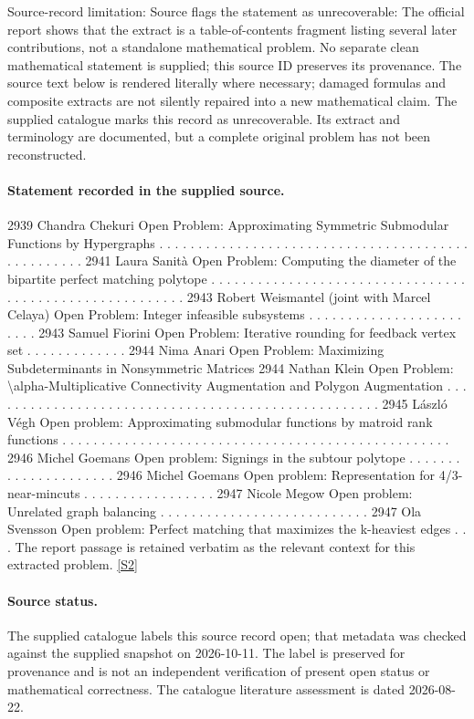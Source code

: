 \documentclass[11pt]{article}
\begin{document}
Source-record limitation: Source flags the statement as unrecoverable: The official report shows that the extract is a table-of-contents fragment listing several later contributions, not a standalone mathematical problem. No separate clean mathematical statement is supplied; this source ID preserves its provenance.
The source text below is rendered literally where necessary; damaged formulas and composite extracts are not silently repaired into a new mathematical claim.
The supplied catalogue marks this record as unrecoverable. Its extract and terminology are documented, but a complete original problem has not been reconstructed.
\paragraph{Statement recorded in the supplied source.}
2939 Chandra Chekuri Open Problem: Approximating Symmetric Submodular Functions by Hypergraphs . . . . . . . . . . . . . . . . . . . . . . . . . . . . . . . . . . . . . . . . . . . . . . . . . . 2941 Laura Sanità Open Problem: Computing the diameter of the bipartite perfect matching polytope . . . . . . . . . . . . . . . . . . . . . . . . . . . . . . . . . . . . . . . . . . . . . . . . . . . . . . . . 2943 Robert Weismantel (joint with Marcel Celaya) Open Problem: Integer infeasible subsystems . . . . . . . . . . . . . . . . . . . . . . . . 2943 Samuel Fiorini Open Problem: Iterative rounding for feedback vertex set . . . . . . . . . . . . . 2944 Nima Anari Open Problem: Maximizing Subdeterminants in Nonsymmetric Matrices 2944 Nathan Klein Open Problem: \textbackslash{}alpha-Multiplicative Connectivity Augmentation and Polygon Augmentation . . . . . . . . . . . . . . . . . . . . . . . . . . . . . . . . . . . . . . . . . . . . . . . . . . . 2945 László Végh Open problem: Approximating submodular functions by matroid rank functions . . . . . . . . . . . . . . . . . . . . . . . . . . . . . . . . . . . . . . . . . . . . . . . . . . 2946 Michel Goemans Open problem: Signings in the subtour polytope . . . . . . . . . . . . . . . . . . . . . 2946 Michel Goemans Open problem: Representation for 4/3-near-mincuts . . . . . . . . . . . . . . . . . 2947 Nicole Megow Open problem: Unrelated graph balancing . . . . . . . . . . . . . . . . . . . . . . . . . . . 2947 Ola Svensson Open problem: Perfect matching that maximizes the k-heaviest edges . . . The report passage is retained verbatim as the relevant context for this extracted problem. \href{https://doi.org/10.4171/owr/2021/53}{[S2]}
\paragraph{Source status.}
The supplied catalogue labels this source record open; that metadata was checked against the supplied snapshot on 2026-10-11. The label is preserved for provenance and is not an independent verification of present open status or mathematical correctness. The catalogue literature assessment is dated 2026-08-22.
\end{document}
